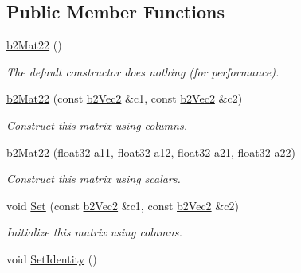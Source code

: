 \subsection*{Public Member Functions}
\begin{DoxyCompactItemize}
\item 
\mbox{\label{structb2Mat22_ac3e10f6d457c8dab9062ba378f66bc4d}} 
\hyperlink{structb2Mat22_ac3e10f6d457c8dab9062ba378f66bc4d}{b2\+Mat22} ()
\begin{DoxyCompactList}\small\item\em The default constructor does nothing (for performance). \end{DoxyCompactList}\item 
\mbox{\label{structb2Mat22_abd674c6d92e26962977f34bcd92ff24d}} 
\hyperlink{structb2Mat22_abd674c6d92e26962977f34bcd92ff24d}{b2\+Mat22} (const \hyperlink{structb2Vec2}{b2\+Vec2} \&c1, const \hyperlink{structb2Vec2}{b2\+Vec2} \&c2)
\begin{DoxyCompactList}\small\item\em Construct this matrix using columns. \end{DoxyCompactList}\item 
\mbox{\label{structb2Mat22_a41d5d8743bda32cb8c6e212528934810}} 
\hyperlink{structb2Mat22_a41d5d8743bda32cb8c6e212528934810}{b2\+Mat22} (float32 a11, float32 a12, float32 a21, float32 a22)
\begin{DoxyCompactList}\small\item\em Construct this matrix using scalars. \end{DoxyCompactList}\item 
\mbox{\label{structb2Mat22_aed3bee1de38a0b3f36e21c90faa24112}} 
void \hyperlink{structb2Mat22_aed3bee1de38a0b3f36e21c90faa24112}{Set} (const \hyperlink{structb2Vec2}{b2\+Vec2} \&c1, const \hyperlink{structb2Vec2}{b2\+Vec2} \&c2)
\begin{DoxyCompactList}\small\item\em Initialize this matrix using columns. \end{DoxyCompactList}\item 
\mbox{\label{structb2Mat22_a7192f063b771ac9ded060e41df890509}} 
void \hyperlink{structb2Mat22_a7192f063b771ac9ded060e41df890509}{Set\+Identity} ()

\end{DoxyCompactItemize}
